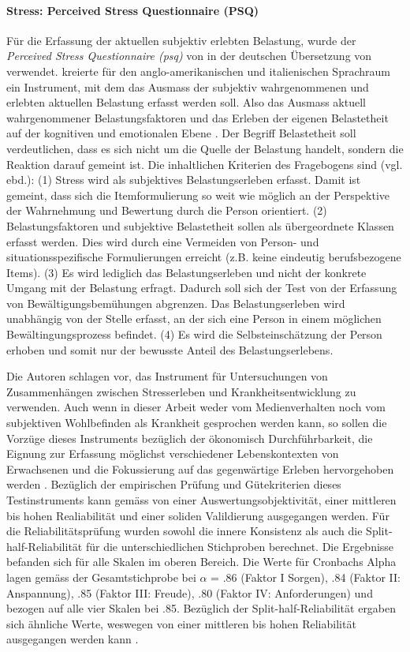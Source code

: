 \paragraph{Stress: Perceived Stress Questionnaire (PSQ)}\label{sec:PSQ}
Für die Erfassung der aktuellen subjektiv erlebten Belastung, wurde der \textit{Perceived Stress Questionnaire (\acrshort{psq})} von  in der deutschen Übersetzung von  verwendet.
 kreierte für den anglo-amerikanischen und italienischen Sprachraum ein Instrument, mit dem das Ausmass der subjektiv wahrgenommenen und erlebten aktuellen Belastung erfasst werden soll. Also das Ausmass aktuell wahrgenommener Belastungsfaktoren und das Erleben der eigenen Belastetheit auf der kognitiven und emotionalen Ebene \cite{Fliege2001}. Der Begriff Belastetheit soll verdeutlichen, dass es sich nicht um die Quelle der Belastung handelt, sondern die Reaktion darauf gemeint ist. Die inhaltlichen Kriterien des Fragebogens sind (vgl. ebd.): (1) Stress wird als subjektives Belastungserleben erfasst. Damit ist gemeint, dass sich die Itemformulierung so weit wie möglich an der Perspektive der Wahrnehmung und Bewertung durch die Person orientiert. (2) Belastungsfaktoren und subjektive Belastetheit sollen als übergeordnete Klassen erfasst werden. Dies wird durch eine Vermeiden von Person- und situationsspezifische Formulierungen erreicht (z.B. keine eindeutig berufsbezogene Items). (3) Es wird lediglich das Belastungserleben und nicht der konkrete Umgang mit der Belastung erfragt. Dadurch soll sich der Test von der Erfassung von Bewältigungsbemühungen abgrenzen. Das Belastungserleben wird unabhängig von der Stelle erfasst, an der sich eine Person in einem möglichen Bewältingungsprozess befindet. (4) Es wird die Selbsteinschätzung der Person erhoben und somit nur der bewusste Anteil des Belastungserlebens.

Die Autoren  schlagen vor, das Instrument für Untersuchungen von Zusammenhängen zwischen Stresserleben und Krankheitsentwicklung zu verwenden. Auch wenn in dieser Arbeit weder vom Medienverhalten noch vom subjektiven Wohlbefinden als Krankheit gesprochen werden kann, so sollen die Vorzüge dieses Instruments bezüglich der ökonomisch Durchführbarkeit, die Eignung zur Erfassung möglichst verschiedener Lebenskontexten von Erwachsenen und die Fokussierung auf das gegenwärtige Erleben hervorgehoben werden \cite{Fliege2001}. Bezüglich der empirischen Prüfung und Gütekriterien dieses Testinstruments kann gemäss  von einer Auswertungsobjektivität, einer mittleren bis hohen Realiabilität und einer soliden Valildierung ausgegangen werden. 
Für die Reliabilitätsprüfung wurden sowohl die innere Konsistenz als auch die Split-half-Reliabilität für die unterschiedlichen Stichproben berechnet. Die Ergebnisse befanden sich für alle Skalen im oberen Bereich. Die Werte für Cronbachs Alpha lagen gemäss \cite{Fliege2001} der Gesamtstichprobe bei $\alpha$ = .86 (Faktor I Sorgen), .84 (Faktor II: Anspannung), .85 (Faktor III: Freude), .80 (Faktor IV: Anforderungen) und bezogen auf alle vier Skalen bei .85. Bezüglich der Split-half-Reliabilität ergaben sich ähnliche Werte, weswegen von einer mittleren bis hohen Reliabilität ausgegangen werden kann \cite{Fliege2001}.

